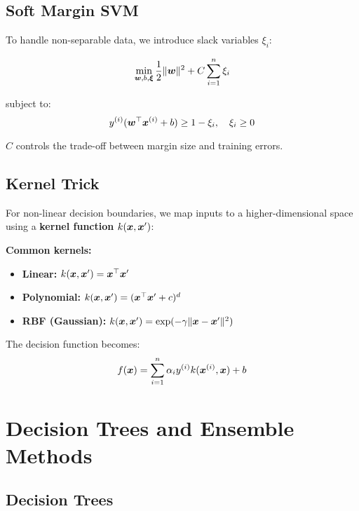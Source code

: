 \subsection{Soft Margin SVM}

To handle non-separable data, we introduce slack variables $\xi_i$:

\begin{equation}
\min_{\boldsymbol{w}, b, \boldsymbol{\xi}} \frac{1}{2}\|\boldsymbol{w}\|^2 + C \sum_{i=1}^{n} \xi_i
\end{equation}

subject to:
\begin{equation}
y^{(i)}(\boldsymbol{w}^\top \boldsymbol{x}^{(i)} + b) \geq 1 - \xi_i, \quad \xi_i \geq 0
\end{equation}

$C$ controls the trade-off between margin size and training errors.

\subsection{Kernel Trick}

For non-linear decision boundaries, we map inputs to a higher-dimensional space using a \textbf{kernel function} $k(\boldsymbol{x}, \boldsymbol{x}')$:

\textbf{Common kernels:}
\begin{itemize}
    \item \textbf{Linear:} $k(\boldsymbol{x}, \boldsymbol{x}') = \boldsymbol{x}^\top \boldsymbol{x}'$
    \item \textbf{Polynomial:} $k(\boldsymbol{x}, \boldsymbol{x}') = (\boldsymbol{x}^\top \boldsymbol{x}' + c)^d$
    \item \textbf{RBF (Gaussian):} $k(\boldsymbol{x}, \boldsymbol{x}') = \exp(-\gamma \|\boldsymbol{x} - \boldsymbol{x}'\|^2)$
\end{itemize}

The decision function becomes:
\begin{equation}
f(\boldsymbol{x}) = \sum_{i=1}^{n} \alpha_i y^{(i)} k(\boldsymbol{x}^{(i)}, \boldsymbol{x}) + b
\end{equation}

\section{Decision Trees and Ensemble Methods}
\label{sec:decision-trees}

\subsection{Decision Trees}

